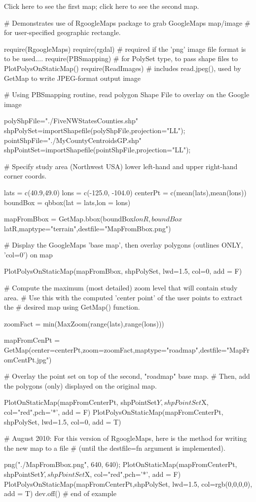 Click here to see the first map; click here to see the second map.



# Demonstrates use of RgoogleMaps package to grab GoogleMaps map/image
# for user-specified geographic rectangle.

   require(RgoogleMaps)
   require(rgdal)      # required if the 'png' image file format is to be used....
   require(PBSmapping) # for PolySet type, to  pass shape files to  PlotPolysOnStaticMap()
   require(ReadImages) # includes read.jpeg(), used by GetMap to write JPEG-format output image

# Using PBSmapping routine, read polygon Shape File to overlay on the Google image

   polyShpFile="./FiveNWStatesCounties.shp"
   shpPolySet=importShapefile(polyShpFile,projection="LL");
   pointShpFile="./MyCountyCentroidsGP.shp"
   shpPointSet=importShapefile(pointShpFile,projection="LL");

# Specify study area (Northwest USA) lower left-hand and upper right-hand corner coords.

   lats = c(40.9,49.0)
   lons = c(-125.0, -104.0)
   centerPt = c(mean(lats),mean(lons))
   boundBox = qbbox(lat = lats,lon = lons)

   mapFromBbox = GetMap.bbox(boundBox$lonR,boundBox$latR,maptype="terrain",destfile="MapFromBbox.png")
   
# Display the GoogleMaps 'base map', then overlay polygons (outlines ONLY, 'col=0') on map
   
   PlotPolysOnStaticMap(mapFromBbox, shpPolySet, lwd=1.5, col=0, add = F)

# Compute the maximum (most detailed) zoom level that will contain study area.
# Use this with the computed 'center point' of the user points to extract the
# desired map using GetMap() function.

   zoomFact = min(MaxZoom(range(lats),range(lons)))
   
   mapFromCenPt = GetMap(center=centerPt,zoom=zoomFact,maptype="roadmap",destfile="MapFromCentPt.jpg")

# Overlay the point set on top of the second, "roadmap" base map.
# Then, add the polygons (only) displayed on the original map.

   PlotOnStaticMap(mapFromCenterPt, shpPointSet$Y,shpPointSet$X, col="red",pch='*', add = F)
   PlotPolysOnStaticMap(mapFromCenterPt, shpPolySet, lwd=1.5, col=0, add = T)

# August 2010: For this version of RgoogleMaps, here is the method for writing the new map to a file
# (until the destfile=fn argument is implemented).
   
   png("./MapFromBbox.png", 640, 640);
   PlotOnStaticMap(mapFromCenterPt, shpPointSet$Y,shpPointSet$X, col="red",pch='*', add = F)
   PlotPolysOnStaticMap(mapFromCenterPt,shpPolySet, lwd=1.5, col=rgb(0,0,0,0), add = T)
   dev.off() # end of example
